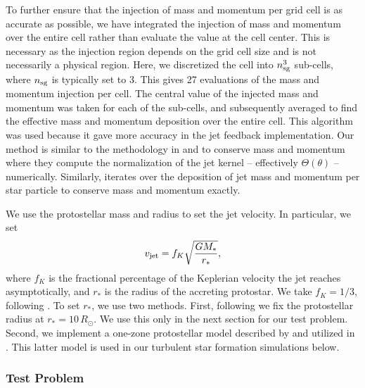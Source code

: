 \documentclass[../dissertation.tex]{subfiles}
\begin{document}
To further ensure that the injection of mass and momentum per grid cell is as accurate as possible, we have integrated the injection of mass and momentum over the entire cell rather than evaluate the value at the cell center.  This is necessary as the injection region depends on the grid cell size and is not necessarily a physical region.
Here, we discretized the cell into $n_{\rm sg}^3$ sub-cells, where $n_{\rm sg}$ is typically set to 3. This gives 27 evaluations of the mass and momentum injection per cell.
The central value of the injected mass and momentum was taken for each of the sub-cells, and subsequently averaged to find the effective mass and momentum deposition over the entire cell.
This algorithm was used because it gave more accuracy in the jet feedback implementation.
Our method is similar to the methodology in \citet{2011ApJ...740..107C} and \citet{2014MNRAS.439.3420M} to conserve mass and momentum where they compute the normalization of the jet kernel -- effectively $\Theta(\theta)$ -- numerically.
Similarly, \citet{2014ApJ...790..128F} iterates over the deposition of jet mass and momentum per star particle to conserve mass and momentum exactly.

We use the protostellar mass and radius to set the jet velocity.
In particular, we set
\begin{equation}\label{eq:jet_vjet}
v_{\rm jet} = f_{K} \sqrt{\frac{GM_*}{r_*}},
\end{equation}
where $f_{K}$ is the fractional percentage of the Keplerian velocity the jet reaches asymptotically, and $r_*$ is the radius of the accreting protostar.
We take $f_{K} = 1/3$, following \citet{2014MNRAS.439.3420M}.
To set $r_*$, we use two methods.
First, following \citet{2014ApJ...790..128F} we fix the protostellar radius at $r_* = 10\,R_{\odot}$.
We use this only in the next section for our test problem.
Second, we implement a one-zone protostellar model described by \citet[][hereafter known as O09]{2009ApJ...703..131O} and utilized in \citet{2014MNRAS.439.3420M}.
This latter model is used in our turbulent star formation simulations below.

\subsubsection{Test Problem}
\end{document}
